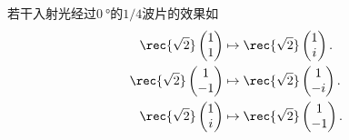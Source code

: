 \documentclass{ctexart}
\begin{document}
\begin{sample}
    \begin{ex}
        若干入射光经过$\SI{0}{\degree}$的$1/4$波片的效果如
        \begin{align*}
            \rec{\sqrt{2}} \begin{pmatrix}
                1 \\ 1
            \end{pmatrix} &\mapsto \rec{\sqrt{2}}\begin{pmatrix}
                1 \\ i
            \end{pmatrix}. \\
            \rec{\sqrt{2}} \begin{pmatrix}
                1 \\ -1
            \end{pmatrix} &\mapsto \rec{\sqrt{2}}\begin{pmatrix}
                1 \\ -i
            \end{pmatrix}. \\
            \rec{\sqrt{2}} \begin{pmatrix}
                1 \\ i
            \end{pmatrix} &\mapsto \rec{\sqrt{2}}\begin{pmatrix}
                1 \\ -1
            \end{pmatrix}.
        \end{align*}
    \end{ex}
\end{sample}
\end{document}
